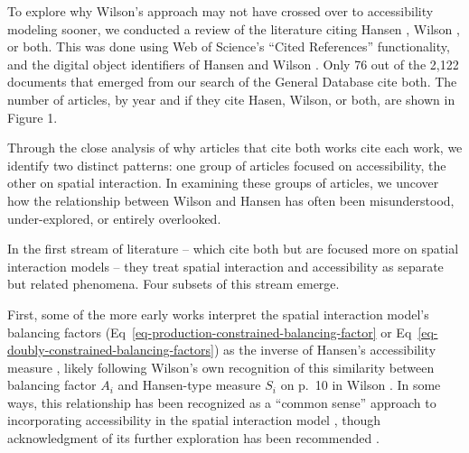 \documentclass[
  10pt,
  letterpaper,
]{article}
\begin{document}
To explore why Wilson's approach may not have crossed over to
accessibility modeling sooner, we conducted a review of the literature
citing Hansen \citep{hansen1959}, Wilson \citep{wilson1971}, or both.
This was done using Web of Science's ``Cited References'' functionality,
and the digital object identifiers of Hansen \citep{hansen1959} and
Wilson \citep{wilson1971}. Only 76 out of the 2,122 documents that
emerged from our search of the General Database cite both. The number of
articles, by year and if they cite Hasen, Wilson, or both, are shown in
Figure 1.

Through the close analysis of why articles that cite both works cite
each work, we identify two distinct patterns: one group of articles
focused on accessibility, the other on spatial interaction. In examining
these groups of articles, we uncover how the relationship between Wilson
and Hansen has often been misunderstood, under-explored, or entirely
overlooked.

In the first stream of literature -- which cite both but are focused
more on spatial interaction models -- they treat spatial interaction and
accessibility as separate but related phenomena. Four subsets of this
stream emerge.

First, some of the more early works interpret the spatial interaction
model's balancing factors
(Eq~\ref{eq-production-constrained-balancing-factor} or
Eq~\ref{eq-doubly-constrained-balancing-factors}) as the inverse of
Hansen's accessibility measure
\citep{harrisEquilibriumValuesDynamics1978, leonardiOptimumFacilityLocation1978, fotheringhamSPATIALSTRUCTUREDISTANCE1981, fotheringhamSpatialCompetitionAgglomeration1985},
likely following Wilson's own recognition of this similarity between
balancing factor \(A_i\) and Hansen-type measure \(S_i\) on p.~10 in
Wilson \citep{wilson1971}. In some ways, this relationship has been
recognized as a ``common sense'' approach to incorporating accessibility
in the spatial interaction model
\citep[p.~99]{morrisAccessibilityIndicatorsTransport1979}, though
acknowledgment of its further exploration has been recommended
\citep{battyMethodResiduesUrban1976}.
\end{document}
